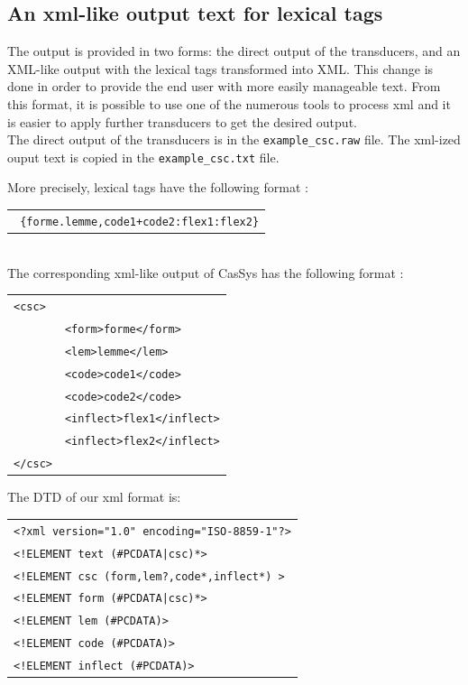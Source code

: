 \subsection{An xml-like output text for lexical tags}

The output is provided in two forms: the direct output of the transducers, and an XML-like output with the lexical tags transformed into XML. This change is done in order to provide the end user with more easily manageable text. 
From this format, it is possible to use one of the numerous tools to process xml and it is easier to apply further transducers to get the desired output.\\
The direct output of the transducers is in the \texttt{example\_csc.raw} file. The xml-ized ouput text is copied in the \texttt{example\_csc.txt} file.

More precisely, lexical tags have the following format :\\
\begin{tabular}{c}
\texttt{
\{forme.lemme,code1+code2:flex1:flex2\}}
\end{tabular}\\
The corresponding xml-like output of CasSys has the following format :\\
\begin{tabular}{ll}
\texttt{<csc>}&\\
	&\texttt{<form>forme</form>}\\
	&\texttt{<lem>lemme</lem>}\\
	&\texttt{<code>code1</code>}\\
	&\texttt{<code>code2</code>}\\
	&\texttt{<inflect>flex1</inflect>}\\
	&\texttt{<inflect>flex2</inflect>}\\
\texttt{</csc>}&\\
\end{tabular}

The DTD of our xml format is:

\begin{tabular}{l}
\texttt{<?xml version="1.0" encoding="ISO-8859-1"?>}\\
\texttt{<!ELEMENT text (\#PCDATA|csc)*>}\\
\texttt{<!ELEMENT csc (form,lem?,code*,inflect*) >}\\
\texttt{<!ELEMENT form (\#PCDATA|csc)*>}\\
\texttt{<!ELEMENT lem (\#PCDATA)>}\\
\texttt{<!ELEMENT code (\#PCDATA)>}\\
\texttt{<!ELEMENT inflect (\#PCDATA)>}\\
\end{tabular}


